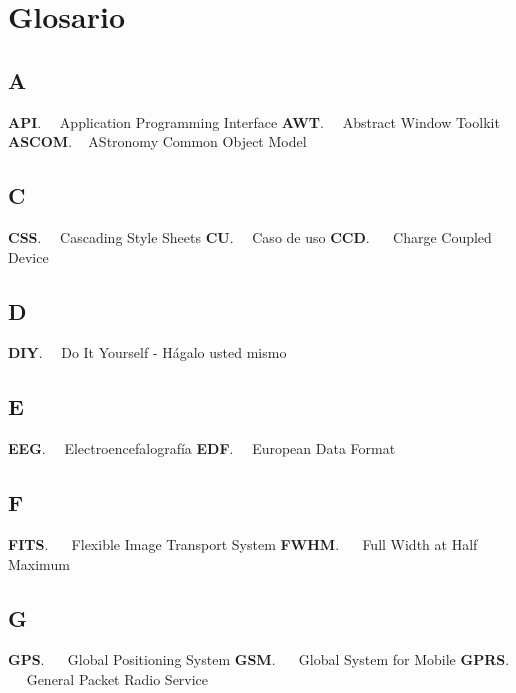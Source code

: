 \chapter*{Glosario}



{
	\section*{A}
}
\noindent 
\textbf{API}. \label{API} \ \ Application Programming Interface
\newline
\textbf{AWT}. \ \ Abstract Window Toolkit
\newline
\textbf{ASCOM}. \ \label{ASCOM} AStronomy Common Object Model



{
	\section*{C}
}
\noindent 
\textbf{CSS}. \ \ Cascading Style Sheets
\newline
\textbf{CU}. \ \ Caso de uso
\newline
\textbf{CCD}. \ \ \label{CCD} Charge Coupled Device

 {
 	\section*{D}
 }
 
 \noindent 
 \textbf{DIY}.  \label{DIY} \ \ Do It Yourself - Hágalo usted mismo

{
	\section*{E}
}
\noindent 
\textbf{EEG}. \ \ Electroencefalografía
\newline
\textbf{EDF}. \ \ European Data Format

{
	\section*{F}
}
\noindent 
\textbf{FITS}. \ \ \label{FITS} Flexible Image Transport System
\newline
\textbf{FWHM}. \ \ \label{FWHM} Full Width at Half Maximum

{
	\section*{G}
}
\noindent 
\textbf{GPS}. \ \ \label{GPS} Global Positioning System
\newline
\textbf{GSM}. \ \ \label{GSM} Global System for Mobile 
\newline
\textbf{GPRS}. \ \ \label{GPRS} General Packet Radio Service 




